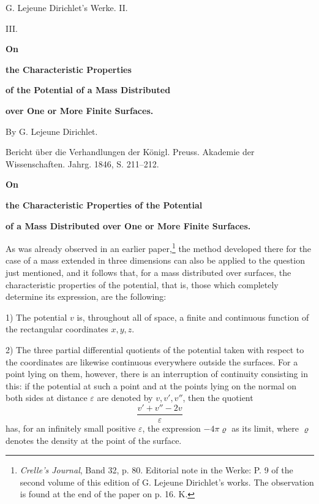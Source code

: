 \documentclass[11pt]{article}
\begin{document}
\begin{center}
{\Large G. Lejeune Dirichlet's Werke. II.}\par\vspace{1.5em}
{\Large III.}\par\vspace{0.5em}
{\LARGE \textbf{On}}\par
{\LARGE \textbf{the Characteristic Properties}}\par
{\LARGE \textbf{of the Potential of a Mass Distributed}}\par
{\LARGE \textbf{over One or More Finite Surfaces.}}\par\vspace{1em}
{\large By G. Lejeune Dirichlet.}\par\vspace{0.5em}
{\small Bericht über die Verhandlungen der Königl. Preuss. Akademie der Wissenschaften. Jahrg. 1846, S. 211--212.}
\end{center}

\begin{center}
\textbf{On}\par
\textbf{the Characteristic Properties of the Potential}\par
\textbf{of a Mass Distributed over One or More Finite Surfaces.}
\end{center}

As was already observed in an earlier paper,\footnote{\emph{Crelle's Journal}, Band 32, p. 80. Editorial note in the Werke: P. 9 of the second volume of this edition of G. Lejeune Dirichlet's works. The observation is found at the end of the paper on p. 16. K.} the method developed there for the case of a mass extended in three dimensions can also be applied to the question just mentioned, and it follows that, for a mass distributed over surfaces, the characteristic properties of the potential, that is, those which completely determine its expression, are the following:

1) The potential $v$ is, throughout all of space, a finite and continuous function of the rectangular coordinates $x,y,z$.

2) The three partial differential quotients of the potential taken with respect to the coordinates are likewise continuous everywhere outside the surfaces. For a point lying on them, however, there is an interruption of continuity consisting in this: if the potential at such a point and at the points lying on the normal on both sides at distance $\varepsilon$ are denoted by $v,v',v''$, then the quotient
\[
\frac{v'+v''-2v}{\varepsilon}
\]
has, for an infinitely small positive $\varepsilon$, the expression $-4\pi\varrho$ as its limit, where $\varrho$ denotes the density at the point of the surface.
\end{document}
